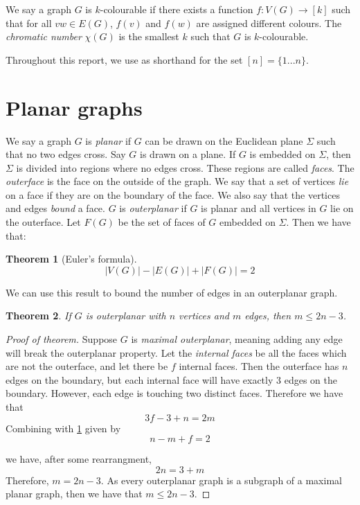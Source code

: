 \documentclass[]{report}
\newtheorem{theorem}{Theorem}
\theoremstyle{definition}
\numberwithin{theorem}{section}
\numberwithin{equation}{section}
\begin{document}
We say a graph $G$ is $k$-colourable if there exists a function $f: V(G) \rightarrow [k]$ such that for all $vw \in E(G)$, $f(v)$ and $f(w)$ are assigned different colours. The \textit{chromatic number} $\chi(G)$ is the smallest $k$ such that $G$ is $k$-colourable. 

Throughout this report, we use as shorthand for the set $[n] = \lbrace 1... n \rbrace$. 

\section{Planar graphs}\label{sec:Planar graphs}
We say a graph $G$ is \textit{planar} if $G$ can be drawn on the Euclidean plane $\Sigma$ such that no two edges cross. Say $G$ is drawn on a plane. If $G$ is embedded on $\Sigma$, then $\Sigma$ is divided into regions where no edges cross. These regions are called \textit{faces}. The \textit{outerface} is the face on the outside of the graph. We say that a set of vertices \textit{lie} on a face if they are on the boundary of the face. We also say that the vertices and edges \textit{bound} a face. $G$ is \textit{outerplanar} if $G$ is planar and all vertices in $G$ lie on the outerface. 
Let $F(G)$ be the set of faces of $G$ embedded on $\Sigma$. Then we have that:
\begin{theorem}[Euler's formula]\label{thm:Euler_planar}
	\begin{equation}
		|V(G)| - |E(G)| + |F(G)| = 2
	\end{equation}
\end{theorem}

We can use this result to bound the number of edges in an outerplanar graph.
\begin{theorem}\label{thm:outerplanar_bound}
	If $G$ is outerplanar with $n$ vertices and $m$ edges, then $m \leq 2n - 3$.
\end{theorem}

\begin{proof}[Proof of theorem]
	Suppose $G$ is \textit{maximal outerplanar}, meaning adding any edge will break the outerplanar property. Let the \textit{internal faces} be all the faces which are not the outerface, and let there be $f$ internal faces. Then the outerface has $n$ edges on the boundary, but each internal face will have exactly $3$ edges on the boundary. However, each edge is touching two distinct faces. Therefore we have that
	\begin{equation}
		3 f - 3 + n = 2m
	\end{equation}
	Combining with \cref{thm:Euler_planar} given by
	\begin{equation}
		n - m + f = 2
	\end{equation}
	
	we have, after some rearrangment, 
	\begin{equation}
		2n = 3 + m
	\end{equation}
	Therefore, $m = 2n - 3$. As every outerplanar graph is a subgraph of a maximal planar graph, then we have that $m \leq 2n - 3$. 
\end{proof}
\end{document}
